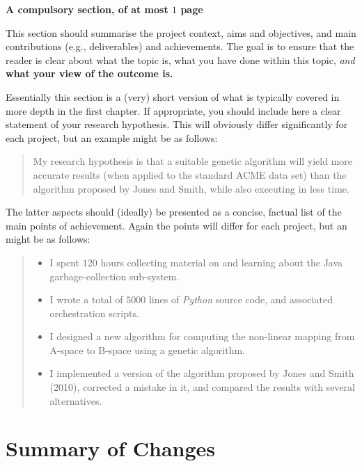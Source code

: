 \documentclass[ %
                    author={Daniel Page},
                supervisor={Dr. Andrew Calway},
                    degree={MSc},
                     title={Some Structural Guidelines for Data Science MSc Theses, Including Those With Long Titles that Run Across Multiple Lines on the Front Page},
                  subtitle={And those including an optional subtitle too, for good measure},
                      type={},
                      year={2021}]{dissertation}
\begin{document}
{\bf A compulsory section, of at most $1$ page} 
\vspace{1cm} 

\noindent
This section should summarise the project context, aims and objectives,
and main contributions (e.g., deliverables) and achievements.  The goal is to ensure that the 
reader is clear about what the topic is, what you have done within this 
topic, {\em and}\/ {\bf what your view of the outcome is.}

Essentially 
this section is a (very) short version of what is typically covered in more depth in the first 
chapter.  If appropriate, you should include here  
a clear statement of your research hypothesis.  This will obviously differ significantly
for each project, but an example might be as follows:

\begin{quote}
My research hypothesis is that a suitable genetic algorithm will yield
more accurate results (when applied to the standard ACME data set) than 
the algorithm proposed by Jones and Smith, while also executing in less
time.
\end{quote}

\noindent
The latter aspects should (ideally) be presented as a concise, factual 
list of the main points of achievement.  Again the points will differ for each project, but 
an might be as follows:

\begin{quote}
\noindent
\begin{itemize}
\item I spent $120$ hours collecting material on and learning about the 
      Java garbage-collection sub-system. 
\item I wrote a total of $5000$ lines of {\em Python} source code, and associated orchestration scripts. 
\item I designed a new algorithm for computing the non-linear mapping 
      from A-space to B-space using a genetic algorithm.
\item I implemented a version of the algorithm proposed by Jones and 
      Smith (2010), corrected a mistake in it, and 
      compared the results with several alternatives.
\end{itemize}
\end{quote}


\chapter*{Summary of Changes}
\end{document}
